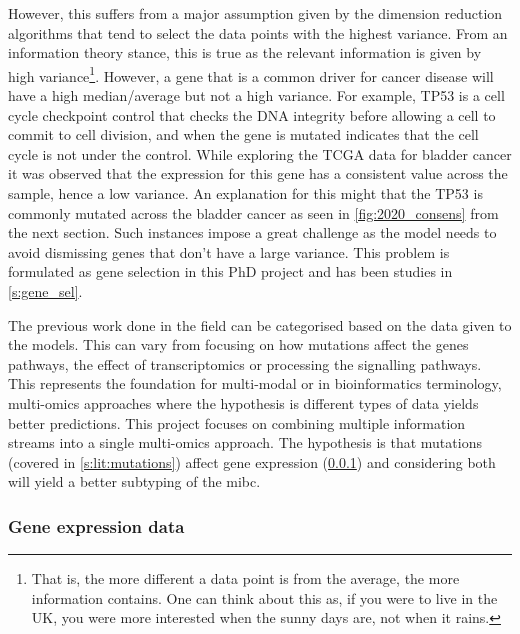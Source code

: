 However, this suffers from a major assumption given by the dimension reduction algorithms that tend to select the data points with the highest variance. From an information theory stance, this is true as the relevant information is given by high variance\footnote{That is, the more different a data point is from the average, the more information contains. One can think about this as, if you were to live in the UK, you were more interested when the sunny days are, not when it rains.}. However, a gene that is a common driver for cancer disease will have a high median/average but not a high variance. For example, TP53 is a cell cycle checkpoint control that checks the DNA integrity before allowing a cell to commit to cell division, and when the gene is mutated indicates that the cell cycle is not under the control. While exploring the TCGA data for bladder cancer \cite{Tcga2018-sj,Robertson2017-mg} it was observed that the expression for this gene has a consistent value across the sample, hence a low variance. An explanation for this might that the TP53 is commonly mutated across the bladder cancer as seen in \cref{fig:2020_consens} from the next section. Such instances impose a great challenge as the model needs to avoid dismissing genes that don't have a large variance. This problem is formulated as gene selection in this PhD project and has been studies in \cref{s:gene_sel}.


The previous work done in the field can be categorised based on the data given to the models. This can vary from focusing on how mutations affect the genes pathways, the effect of transcriptomics or processing the signalling pathways. This represents the foundation for multi-modal or in bioinformatics terminology, multi-omics approaches where the hypothesis is different types of data yields better predictions. This project focuses on combining multiple information streams into a single multi-omics approach. The hypothesis is that mutations (covered in \cref{s:lit:mutations}) affect gene expression (\cref{s:lit:rnaSeq}) and considering both will yield a better subtyping of the \acrlong{mibc}.

\subsubsection{Gene expression data} \label{s:lit:rnaSeq}

